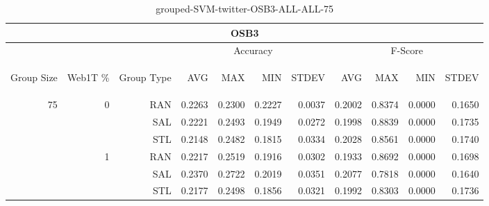 \begin{center}
\begin{table}[htbp] 
 \begin{center}
\begin{tabular}{ | r | r | r | r | r | r | r | r | r | r | r |}
\hline
\multicolumn{11}{|c|}{OSB3}\\
\hline
 & & & \multicolumn{4}{|c|}{Accuracy} & \multicolumn{4}{|c|}{F-Score}\\ \cline{4-11}
\begin{sideways}Group Size\end{sideways} & \begin{sideways}Web1T \%\end{sideways} & \begin{sideways}Group Type\end{sideways} & \begin{sideways}AVG\end{sideways} & \begin{sideways}MAX\end{sideways} & \begin{sideways}MIN\end{sideways} & \begin{sideways}STDEV\end{sideways} & \begin{sideways}AVG\end{sideways} & \begin{sideways}MAX\end{sideways} & \begin{sideways}MIN\end{sideways} & \begin{sideways}STDEV\end{sideways}\\
\hline
\multirow{6}{*}{75}
 & \multirow{3}{*}{0} & RAN & 0.2263 & 0.2300 & 0.2227 & 0.0037 & 0.2002 & 0.8374 & 0.0000 & 0.1650\\ \cline{3-11}
 &   & SAL & 0.2221 & 0.2493 & 0.1949 & 0.0272 & 0.1998 & 0.8839 & 0.0000 & 0.1735\\ \cline{3-11}
 &   & STL & 0.2148 & 0.2482 & 0.1815 & 0.0334 & 0.2028 & 0.8561 & 0.0000 & 0.1740\\ \cline{2-11}
 & \multirow{3}{*}{1} & RAN & 0.2217 & 0.2519 & 0.1916 & 0.0302 & 0.1933 & 0.8692 & 0.0000 & 0.1698\\ \cline{3-11}
 &   & SAL & 0.2370 & 0.2722 & 0.2019 & 0.0351 & 0.2077 & 0.7818 & 0.0000 & 0.1640\\ \cline{3-11}
 &   & STL & 0.2177 & 0.2498 & 0.1856 & 0.0321 & 0.1992 & 0.8303 & 0.0000 & 0.1736\\ \cline{2-11}
\hline
\end{tabular}
\caption{grouped-SVM-twitter-OSB3-ALL-ALL-75}
\end{center}
 \end{table}
\end{center}

